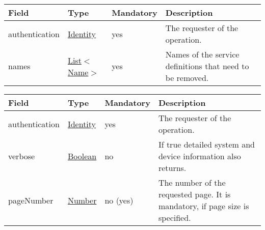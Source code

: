 \documentclass[a4paper]{arrowhead}
\newcommand{\pref}[1]{{\textcolor{ArrowheadGrey}{\hyperref[sec:model:primitives:#1]{#1}}}}
\begin{document}

\begin{table}[ht!]
\begin{tabularx}{\textwidth}{| p{2.5cm} | p{2.5cm} | p{2cm} | X |} \hline
\rowcolor{gray!33} Field & Type & Mandatory & Description \\ \hline
authentication & \hyperref[sec:model:Identity]{Identity} & yes & The requester of the operation. \\ \hline
names &  \pref{List}$<$\pref{Name}$>$ & yes & Names of the service definitions that need to be removed. \\ \hline
\end{tabularx}
\end{table}


\begin{table}[ht!]
\begin{tabularx}{\textwidth}{| p{5.6cm} | p{4.9cm} | p{2cm} | X |} \hline
\rowcolor{gray!33} Field & Type & Mandatory & Description \\ \hline
authentication & \hyperref[sec:model:Identity]{Identity} & yes & The requester of the ope\-ration. \\ \hline
verbose & \pref{Boolean} & no & If true detailed system and device information also returns. \\ \hline
pageNumber & \pref{Number} & no (yes) & The number of the requested page. It is mandatory, if page size is specified. \\ \hline
\end{tabularx}
\end{table}
\end{document}
